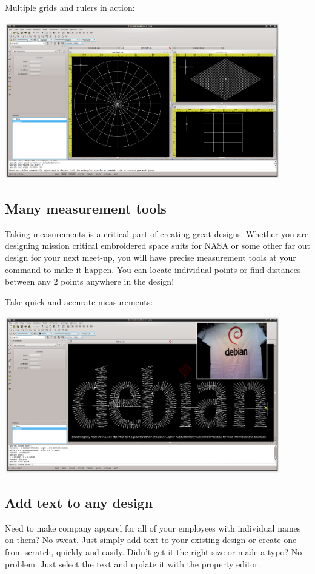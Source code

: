 Multiple grids and rulers in action:

\includegraphics[width=0.9\textwidth]{images/features-grid-ruler-1.png}

\subsection{Many measurement tools}

Taking measurements is a critical part of creating great designs. Whether you are designing mission critical embroidered space suits for NASA or some other far out design for your next meet-up, you will have precise measurement tools at your command to make it happen. You can locate individual points or find distances between any 2 points anywhere in the design!

Take quick and accurate measurements:

\includegraphics[width=0.9\textwidth]{images/features-measure-1.png}

\subsection{Add text to any design}

Need to make company apparel for all of your employees with individual names on them? No sweat. Just simply add text to your existing design or create one from scratch, quickly and easily.
Didn't get it the right size or made a typo? No problem. Just select the text and update it with the property editor.

